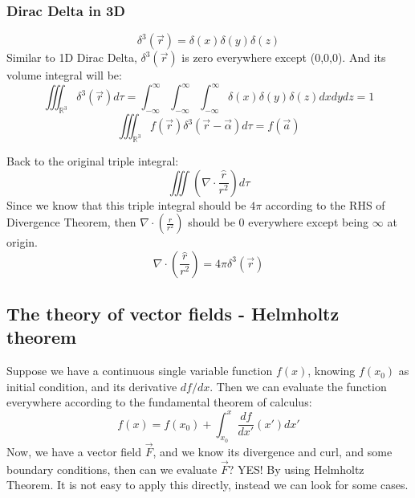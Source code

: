 \documentclass[12pt,a4paper,twoside]{article}
\begin{document}
	\subsubsection{Dirac Delta in 3D}
	\begin{equation}
	   \delta^3(\overrightarrow{r}) = \delta(x)\delta(y)\delta(z)
	\end{equation}
	Similar to 1D Dirac Delta, \(\delta^3(\overrightarrow{r})\) is zero everywhere except (0,0,0). And its volume integral will be:
	\begin{equation}
	    \iiint_{\mathbb{R}^3}\delta^3(\overrightarrow{r})d\tau = \int_{-\infty}^{\infty}\int_{-\infty}^{\infty}\int_{-\infty}^{\infty}\delta(x)\delta(y)\delta(z)dxdydz = 1
	\end{equation}
	\begin{equation}
	    \iiint_{\mathbb{R}^3}f(\overrightarrow{r})\delta^3(\overrightarrow{r}-\overrightarrow{\alpha})d\tau = f(\overrightarrow{a})
	\end{equation}
	
	\noindent Back to the original triple integral:
	\[\iiint (\nabla\cdot \frac{\hat{r}}{r^2})d\tau\]
	Since we know that this triple integral should be $4\pi$ according to the RHS of Divergence Theorem, then \(\nabla\cdot (\frac{\hat{r}}{r^2})\) should be 0 everywhere except being $\infty$ at origin.
	\[\nabla\cdot(\frac{\hat{r}}{r^2})=4\pi \delta^3(\overrightarrow{r})\]
	
	
	\subsection{The theory of vector fields - Helmholtz theorem}
	Suppose we have a continuous single variable function $f(x)$, knowing $f(x_0)$ as initial condition, and its derivative $df/dx$. Then we can evaluate the function everywhere according to the fundamental theorem of calculus:
	\[f(x)=f(x_0)+\int_{x_0}^{x}\frac{df}{dx'}(x')dx'\]
    Now, we have a vector field \(\overrightarrow{F}\), and we know its divergence and curl, and some boundary conditions, then can we evaluate \(\overrightarrow{F}\)? YES! By using Helmholtz Theorem. It is not easy to apply this directly, instead we can look for some cases.\\
	
\end{document}
